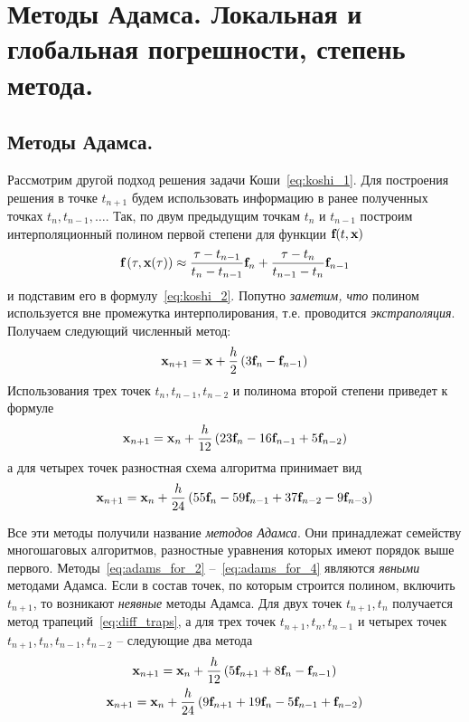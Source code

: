 \documentclass[../../calc-math-exam-2023.tex]{subfiles}
\begin{document}
    \section{Методы Адамса. Локальная и глобальная погрешности, степень метода.}\label{sec:ch25}

    \subsection{Методы Адамса.}
    Рассмотрим другой подход решения задачи Коши~\eqref{eq:koshi_1}. Для построения решения в точке $t_{n+1}$ будем
    использовать информацию в ранее полученных точках $t_n, t_{n-1}, \ldots$. Так, по двум предыдущим точкам $t_n$ и
    $t_{n-1}$ построим интерполяционный полином первой степени для функции $\bf{f}(t, \bf{x})$
    \begin{equation*}
        \bf{f}\left( \tau, \bf{x}(\tau) \right) \approx \frac{\tau - t_{n-1}}{t_n - t_{n-1}}\bf{f}_n + \frac{\tau - t_n}{t_{n-1} - t_n}\bf{f}_{n-1}
    \end{equation*}
    и подставим его в формулу~\eqref{eq:koshi_2}. Попутно \emph{заметим, что} полином используется вне промежутка
    интерполирования, т.е. проводится \emph{экстраполяция}. Получаем следующий численный метод:
    \begin{equation}
        \bf{x}_{n+1} = \bf{x} + \frac{h}{2}\left( 3\bf{f}_n - \bf{f}_{n-1} \right) \label{eq:adams_for_2}
    \end{equation}
    Использования трех точек $t_n, t_{n-1}, t_{n-2}$ и полинома второй степени приведет к формуле
    \begin{equation}
        \bf{x}_{n+1} = \bf{x}_n + \frac{h}{12}\left( 23\bf{f}_n - 16\bf{f}_{n-1} + 5\bf{f}_{n-2} \right) \label{eq:adams_for_3}
    \end{equation}
    а для четырех точек разностная схема алгоритма принимает вид
    \begin{equation}
        \bf{x}_{n+1} = \bf{x}_n + \frac{h}{24}\left( 55\bf{f}_n - 59\bf{f}_{n-1} + 37\bf{f}_{n-2} - 9\bf{f}_{n-3} \right) \label{eq:adams_for_4}
    \end{equation}

    Все эти методы получили название \emph{методов Адамса}. Они принадлежат семейству многошаговых алгоритмов, разностные
    уравнения которых имеют порядок выше первого. Методы~\eqref{eq:adams_for_2} --~\eqref{eq:adams_for_4} являются
    \emph{явными} методами Адамса. Если в состав точек, по которым строится полином, включить $t_{n+1}$, то возникают
    \emph{неявные} методы Адамса. Для двух точек $t_{n+1}, t_n$ получается метод трапеций~\eqref{eq:diff_traps}, а для
    трех точек  $t_{n+1}, t_n, t_{n-1}$ и четырех точек $t_{n+1}, t_n, t_{n-1}, t_{n-2}$ -- следующие два метода
    \begin{gather}
        \bf{x}_{n+1} = \bf{x}_n + \frac{h}{12}\left( 5\bf{f}_{n+1} + 8\bf{f}_n - \bf{f}_{n-1} \right) \label{eq:adams_for_2p1} \\
        \bf{x}_{n+1} = \bf{x}_n + \frac{h}{24}\left( 9\bf{f}_{n+1} + 19\bf{f}_n - 5\bf{f}_{n-1} + \bf{f}_{n-2} \right) \label{eq:adams_for_3p1}
    \end{gather}
    \vspace{5pt}
\end{document}
